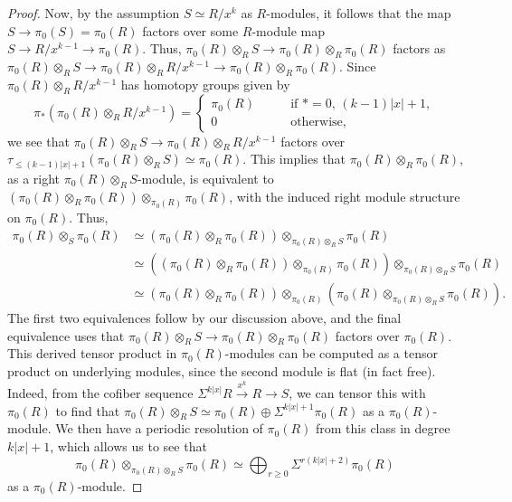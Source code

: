 \documentclass[11pt,leqno]{article}
\newtheorem*{short hand}{theorem name}
\theoremstyle{plain}  %
\theoremstyle{definition}
\numberwithin{equation}{section}
\begin{document}
\begin{proof}
Now, by the assumption $S\simeq R/x^k$ as $R$-modules, it follows that the map $S\to \pi_0(S)=\pi_0(R)$ factors over some $R$-module map $S\to R/x^{k-1}\to \pi_0(R)$.  Thus, $\pi_0(R)\otimes_{R} S\to \pi_0(R)\otimes_R \pi_0(R)$ factors as $\pi_0(R)\otimes_{R} S\to\pi_0(R)\otimes_{R} R/x^{k-1}\to \pi_0(R)\otimes_R \pi_0(R)$.  Since $\pi_0(R)\otimes_{R} R/x^{k-1}$ has homotopy groups given by 
$$\pi_*(\pi_0(R)\otimes_{R} R/x^{k-1})=\begin{cases}
	\pi_0(R) &\qquad \text{if } *=0,\, (k-1)|x|+1,\\
	0 &\qquad \text{otherwise},
	\end{cases}$$
we see that $\pi_0(R)\otimes_{R} S\to \pi_0(R)\otimes_{R} R/x^{k-1}$ factors over $\tau_{\leq (k-1)|x|+1}(\pi_0(R)\otimes_{R} S)\simeq \pi_0(R)$.  This implies that $\pi_0(R)\otimes_{R}\pi_0(R)$, as a right $\pi_0(R)\otimes_{R} S$-module, is equivalent to \\$(\pi_0(R)\otimes_{R} \pi_0(R))\otimes_{\pi_0(R)}\pi_0(R)$, with the induced right module structure on $\pi_0(R)$.  Thus, 
\begin{align*}
\pi_0(R)\otimes_{S}\pi_0(R)&\simeq (\pi_0(R)\otimes_R \pi_0(R))\otimes_{\pi_0(R)\otimes_{R} S} \pi_0(R)\\
&\simeq ((\pi_0(R)\otimes_{R} \pi_0(R))\otimes_{\pi_0(R)} \pi_0(R)) \otimes_{\pi_0(R) \otimes_{R} S}\pi_0(R)\\
&\simeq (\pi_0(R)\otimes_{R} \pi_0(R))\otimes_{\pi_0(R)} (\pi_0(R) \otimes_{\pi_0(R) \otimes_{R} S}\pi_0(R)).
\end{align*}
The first two equivalences follow by our discussion above, and the final equivalence uses that $\pi_0(R)\otimes_{R}S\to \pi_0(R)\otimes_{R}\pi_0(R)$ factors over $\pi_0(R)$.  This derived tensor product in $\pi_0(R)$-modules can be computed as a tensor product on underlying modules, since the second module is flat (in fact free).  Indeed, from the cofiber sequence $\Sigma^{k|x|}R\xrightarrow{x^k}R\to S$, we can tensor this with $\pi_0(R)$ to find that $\pi_0(R)\otimes_{R} S\simeq \pi_0(R)\oplus \Sigma^{k|x|+1}\pi_0(R)$ as a $\pi_0(R)$-module.  We then have a periodic resolution of $\pi_0(R)$ from this class in degree $k|x|+1$, which allows us to see that $$\pi_0(R) \otimes_{\pi_0(R) \otimes_{R} S}\pi_0(R)\simeq \bigoplus_{r\geq 0}\Sigma^{r(k|x|+2)}\pi_0(R)$$ as a $\pi_0(R)$-module.


\end{proof}
\end{document}
